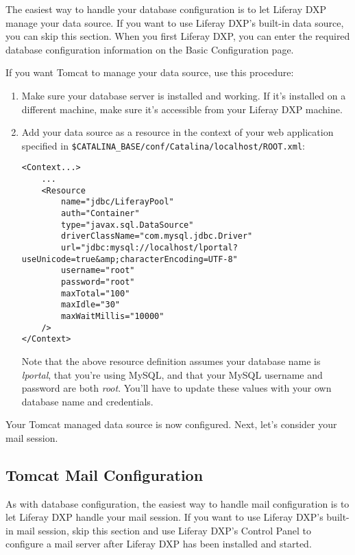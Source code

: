 The easiest way to handle your database configuration is to let Liferay
DXP manage your data source. If you want to use Liferay DXP's built-in
data source, you can skip this section. When you first Liferay DXP, you
can enter the required database configuration information on the Basic
Configuration page.

If you want Tomcat to manage your data source, use this procedure:

\begin{enumerate}
\def\labelenumi{\arabic{enumi}.}
\item
  Make sure your database server is installed and working. If it's
  installed on a different machine, make sure it's accessible from your
  Liferay DXP machine.
\item
  Add your data source as a resource in the context of your web
  application specified in
  \texttt{\$CATALINA\_BASE/conf/Catalina/localhost/ROOT.xml}:

\begin{verbatim}
<Context...>
    ...
    <Resource
        name="jdbc/LiferayPool"
        auth="Container"
        type="javax.sql.DataSource"
        driverClassName="com.mysql.jdbc.Driver"
        url="jdbc:mysql://localhost/lportal?useUnicode=true&amp;characterEncoding=UTF-8"
        username="root"
        password="root"
        maxTotal="100"
        maxIdle="30"
        maxWaitMillis="10000"
    />
</Context>
\end{verbatim}

  Note that the above resource definition assumes your database name is
  \emph{lportal}, that you're using MySQL, and that your MySQL username
  and password are both \emph{root}. You'll have to update these values
  with your own database name and credentials.
\end{enumerate}

Your Tomcat managed data source is now configured. Next, let's consider
your mail session.

\subsection{Tomcat Mail
Configuration}\label{tomcat-mail-configuration}

As with database configuration, the easiest way to handle mail
configuration is to let Liferay DXP handle your mail session. If you
want to use Liferay DXP's built-in mail session, skip this section and use
Liferay DXP's Control Panel to configure a mail server after Liferay DXP
has been installed and started.

